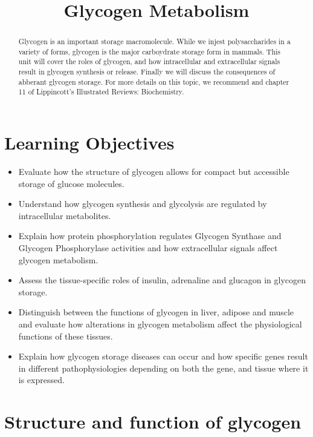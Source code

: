 \documentclass{tufte-handout}
\title{Glycogen Metabolism}
\author{}
\date{}  %
\begin{document}
\maketitle%

\begin{abstract}
\noindent Glycogen is an important storage macromolecule.  While we injest polysaccharides in a variety of forms, glycogen is the major carboydrate storage form in mammals.  This unit will cover the roles of glycogen, and how intracellular and extracellular signals result in glycogen synthesis or release.  Finally we will discuss the consequences of abberant glycogen storage.  For more details on this topic, we recommend \citet{Bollen1998} and chapter 11 of Lippincott's Illustrated Reviews: Biochemistry\cite{Ferrier2017}.
\end{abstract}

\tableofcontents
\pagebreak
\section{Learning Objectives}

\begin{itemize}
\item Evaluate how the structure of glycogen allows for compact but accessible storage of glucose molecules.
\item Understand how glycogen synthesis and glycolysis are regulated by intracellular metabolites.
\item Explain how protein phosphorylation regulates Glycogen Synthase and Glycogen Phosphorylase activities and how extracellular signals affect glycogen metabolism.
\item Assess the tissue-specific roles of insulin, adrenaline and glucagon in glycogen storage.
\item Distinguish between the functions of glycogen in liver, adipose and muscle and evaluate how alterations in glycogen metabolism affect the physiological functions of these tissues.
\item Explain how glycogen storage diseases can occur and how specific genes result in different pathophysiologies depending on both the gene, and tissue where it is expressed.




\end{itemize}

\section{Structure and function of glycogen}
\end{document}
